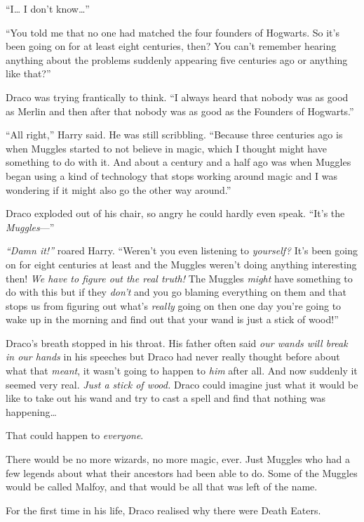 ``I\ldots{} I don't know\ldots{}''

``You told me that no one had matched the four founders of Hogwarts. So
it's been going on for at least eight centuries, then? You can't
remember hearing anything about the problems suddenly appearing five
centuries ago or anything like that?''

Draco was trying frantically to think. ``I always heard that nobody was
as good as Merlin and then after that nobody was as good as the Founders
of Hogwarts.''

``All right,'' Harry said. He was still scribbling. ``Because three
centuries ago is when Muggles started to not believe in magic, which I
thought might have something to do with it. And about a century and a
half ago was when Muggles began using a kind of technology that stops
working around magic and I was wondering if it might also go the other
way around.''

Draco exploded out of his chair, so angry he could hardly even speak.
``It's the \emph{Muggles}---''

\emph{``Damn it!''} roared Harry. ``Weren't you even listening to
\emph{yourself?} It's been going on for eight centuries at least and the
Muggles weren't doing anything interesting then! \emph{We have to figure
out the real truth!} The Muggles \emph{might} have something to do with
this but if they \emph{don't} and you go blaming everything on them and
that stops us from figuring out what's \emph{really} going on then one
day you're going to wake up in the morning and find out that your wand
is just a stick of wood!''

Draco's breath stopped in his throat. His father often said \emph{our
wands will break in our hands} in his speeches but Draco had never
really thought before about what that \emph{meant}, it wasn't going to
happen to \emph{him} after all. And now suddenly it seemed very real.
\emph{Just a stick of wood.} Draco could imagine just what it would be
like to take out his wand and try to cast a spell and find that nothing
was happening\ldots{}

That could happen to \emph{everyone}.

There would be no more wizards, no more magic, ever. Just Muggles who
had a few legends about what their ancestors had been able to do. Some
of the Muggles would be called Malfoy, and that would be all that was
left of the name.

For the first time in his life, Draco realised why there were Death
Eaters.

